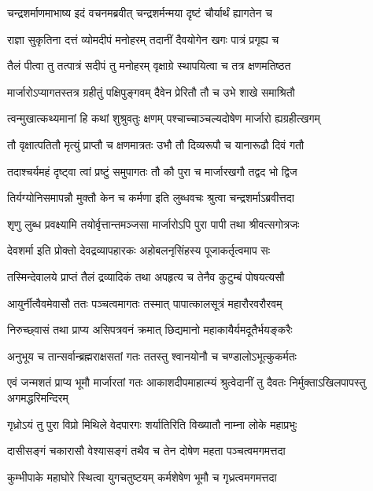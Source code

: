 \twolineshloka
{चन्द्रशर्माणमाभाष्य इदं वचनमब्रवीत्}
{चन्द्रशर्मन्मया दृष्टं चौर्यार्थं ह्यागतेन च} %

\twolineshloka
{राज्ञा सुकृतिना दत्तं व्योमदीपं मनोहरम्}
{तदानीं दैवयोगेन खगः पात्रं प्रगृह्य च} %

\twolineshloka
{तैलं पीत्वा तु तत्पात्रं सदीपं तु मनोहरम्}
{वृक्षाग्रे स्थापयित्वा च तत्र क्षणमतिष्ठत} %

\twolineshloka
{मार्जारोऽप्यागतस्तत्र ग्रहीतुं पक्षिपुङ्गवम्}
{दैवेन प्रेरितौ तौ च उभे शाखे समाश्रितौ} %

\twolineshloka
{त्वन्मुखात्कथ्यमानां हि कथां शुश्रुवतुः क्षणम्}
{पश्चाच्चाञ्चल्यदोषेण मार्जारो ह्यग्रहीत्खगम्} %

\twolineshloka
{तौ वृक्षात्पतितौ मृत्युं प्राप्तौ च क्षणमात्रतः}
{उभौ तौ दिव्यरूपौ च यानारूढौ दिवं गतौ} %

\twolineshloka
{तदाश्चर्यमहं दृष्ट्वा त्वां प्रष्टुं समुपागतः}
{तौ कौ पुरा च मार्जारखगौ तद्वद भो द्विज} %

\twolineshloka
{तिर्यग्योनिसमापन्नौ मुक्तौ केन च कर्मणा}
{इति लुब्धवचः श्रुत्वा चन्द्रशर्माऽब्रवीत्तदा} %

\twolineshloka
{शृणु लुब्ध प्रवक्ष्यामि तयोर्वृत्तान्तमञ्जसा}
{मार्जारोऽपि पुरा पापी तथा श्रीवत्सगोत्रजः} %

\twolineshloka
{देवशर्मा इति प्रोक्तो देवद्रव्यापहारकः}
{अहोबलनृसिंहस्य पूजाकर्तृत्वमाप सः} %

\twolineshloka
{तस्मिन्देवालये प्राप्तं तैलं द्रव्यादिकं तथा}
{अपहृत्य च तेनैव कुटुम्बं पोषयत्यसौ} %

\twolineshloka
{आयुर्नीत्वैवमेवासौ ततः पञ्चत्वमागतः}
{तस्मात् पापात्कालसूत्रं महारौरवरौरवम्} %

\twolineshloka
{निरुच्छ्वासं तथा प्राप्य असिपत्रवनं क्रमात्}
{छिद्यमानो महाकायैर्यमदूतैर्भयङ्करैः} %

\twolineshloka
{अनुभूय च तान्सर्वान्ब्रह्मराक्षसतां गतः}
{ततस्तु श्वानयोनौ च चण्डालोऽभूत्कुकर्मतः} %

\threelineshloka
{एवं जन्मशतं प्राप्य भूमौ मार्जारतां गतः}
{आकाशदीपमाहात्म्यं श्रुत्वेदानीं तु दैवतः}
{निर्मुक्ताऽखिलपापस्तु अगमद्धरिमन्दिरम्} %

\twolineshloka
{गृध्रोऽयं तु पुरा विप्रो मिथिले वेदपारगः}
{शर्यातिरिति विख्यातौ नाम्ना लोके महाप्रभुः} %

\twolineshloka
{दासीसङ्गं चकारासौ वेश्यासङ्गं तथैव च}
{तेन दोषेण महता पञ्चत्वमगमत्तदा} %

\twolineshloka
{कुम्भीपाके महाघोरे स्थित्वा युगचतुष्टयम्}
{कर्मशेषेण भूमौ च गृध्रत्वमगमत्तदा} %


